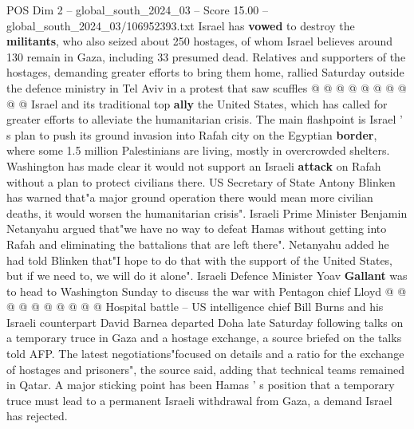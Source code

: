 \begin{textsample}{POS Dim 2 – global\_south\_2024\_03 – Score 15.00 – global\_south\_2024\_03/106952393.txt}
Israel has \textbf{vowed} to destroy the \textbf{militants}, who also seized about 250 hostages, of whom Israel believes around 130 remain in Gaza, including 33 presumed dead.
Relatives and supporters of the hostages, demanding greater efforts to bring them home, rallied Saturday outside the defence ministry in Tel Aviv in a protest that saw scuffles @ @ @ @ @ @ @ @ @ @ Israel and its traditional top \textbf{ally} the United States, which has called for greater efforts to alleviate the humanitarian crisis.
The main flashpoint is Israel ' s plan to push its ground invasion into Rafah city on the Egyptian \textbf{border}, where some 1.5 million Palestinians are living, mostly in overcrowded shelters.
Washington has made clear it would not support an Israeli \textbf{attack} on Rafah without a plan to protect civilians there.
US Secretary of State Antony Blinken has warned that"a major ground operation there would mean more civilian deaths, it would worsen the humanitarian crisis".
Israeli Prime Minister Benjamin Netanyahu argued that"we have no way to defeat Hamas without getting into Rafah and eliminating the battalions that are left there".
Netanyahu added he had told Blinken that"I hope to do that with the support of the United States, but if we need to, we will do it alone".
Israeli Defence Minister Yoav \textbf{Gallant} was to head to Washington Sunday to discuss the war with Pentagon chief Lloyd @ @ @ @ @ @ @ @ @ @ Hospital battle -- US intelligence chief Bill Burns and his Israeli counterpart David Barnea departed Doha late Saturday following talks on a temporary truce in Gaza and a hostage exchange, a source briefed on the talks told AFP.
The latest negotiations"focused on details and a ratio for the exchange of hostages and prisoners", the source said, adding that technical teams remained in Qatar.
A major sticking point has been Hamas ' s position that a temporary truce must lead to a permanent Israeli withdrawal from Gaza, a demand Israel has rejected.

\end{textsample}
